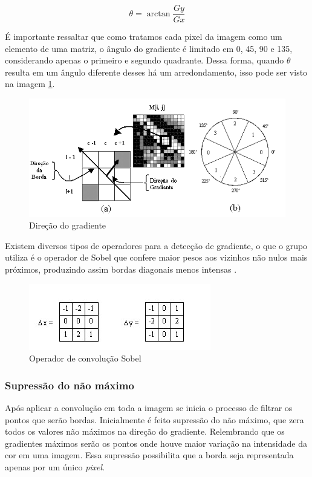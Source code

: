 \documentclass[12pt]{article}
\begin{document}
	\begin{equation}
	 \theta = \arctan \frac{Gy}{Gx}
	\end{equation}
	
	É importante ressaltar que como tratamos cada pixel da imagem como um elemento de uma matriz, o ângulo do gradiente é limitado em 0, 45, 90 e 135, considerando apenas o primeiro e segundo quadrante. Dessa forma, quando $\theta$ resulta em um ângulo diferente desses há um arredondamento, isso pode ser visto na imagem \ref{fig:im10}.
	
	\begin{figure}[h!]
		\centering
		\includegraphics[width=0.7\linewidth]{img/im10}
		\caption{Direção do gradiente \citep{do2002processo}}
		\label{fig:im10}
	\end{figure}
	
	Existem diversos tipos de operadores para a detecção de gradiente, o que o grupo utiliza é o operador de Sobel que confere maior pesos aos vizinhos não nulos mais próximos, produzindo assim bordas diagonais menos intensas \cite{de2006introduccao}.
	
\begin{figure}[h!]
	\centering
	\includegraphics[width=0.7\linewidth]{img/FormatFactorysobel}
	\caption{Operador de convolução Sobel \citep{de2006introduccao}}
	\label{fig:formatfactorysobel}
\end{figure}
		
	
	\subsubsection{Supressão do não máximo}
	
	Após aplicar a convolução em toda a imagem se inicia o processo de filtrar os pontos que serão bordas. Inicialmente é feito supressão do não máximo, que zera todos os valores não máximos na direção do gradiente. Relembrando que os gradientes máximos serão os pontos onde houve maior variação na intensidade da cor em uma imagem. Essa supressão possibilita que a borda seja representada apenas por um único \textit{pixel}.
	
\end{document}
